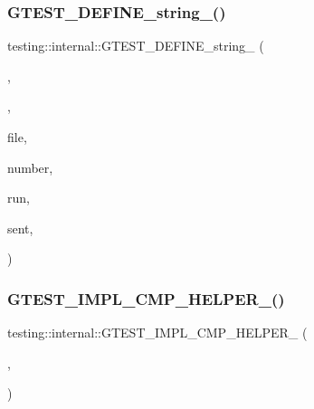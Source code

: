 \subsubsection{\texorpdfstring{G\+T\+E\+S\+T\+\_\+\+D\+E\+F\+I\+N\+E\+\_\+string\+\_\+()}{GTEST\_DEFINE\_string\_()}}
{\footnotesize\ttfamily testing\+::internal\+::\+G\+T\+E\+S\+T\+\_\+\+D\+E\+F\+I\+N\+E\+\_\+string\+\_\+ (\begin{DoxyParamCaption}\item[{internal\+\_\+run\+\_\+death\+\_\+test}]{,  }\item[{\char`\"{}\char`\"{}}]{,  }\item[{\char`\"{}Indicates the}]{file,  }\item[{line}]{number,  }\item[{temporal index of \char`\"{} \char`\"{}the single death test to}]{run,  }\item[{and a file descriptor to \char`\"{} \char`\"{}which a success code may be}]{sent,  }\item[{all separated by \char`\"{} \char`\"{}the \textquotesingle{}$\vert$\textquotesingle{} characters. This flag is specified if and only if the current \char`\"{} \char`\"{}process is a sub-\/process launched for running a thread-\/safe \char`\"{} \char`\"{}death test. F\+OR I\+N\+T\+E\+R\+N\+AL U\+SE O\+N\+L\+Y.\char`\"{}}]{ }\end{DoxyParamCaption})}

\mbox{\label{namespacetesting_1_1internal_aa14e3caa94126d7fb8e06bfb3d24ae4a}} 
\subsubsection{\texorpdfstring{G\+T\+E\+S\+T\+\_\+\+I\+M\+P\+L\+\_\+\+C\+M\+P\+\_\+\+H\+E\+L\+P\+E\+R\+\_\+()}{GTEST\_IMPL\_CMP\_HELPER\_()}\hspace{0.1cm}{\footnotesize\ttfamily [1/5]}}
{\footnotesize\ttfamily testing\+::internal\+::\+G\+T\+E\+S\+T\+\_\+\+I\+M\+P\+L\+\_\+\+C\+M\+P\+\_\+\+H\+E\+L\+P\+E\+R\+\_\+ (\begin{DoxyParamCaption}\item[{NE}]{,  }\item[{!}]{ }\end{DoxyParamCaption})}

